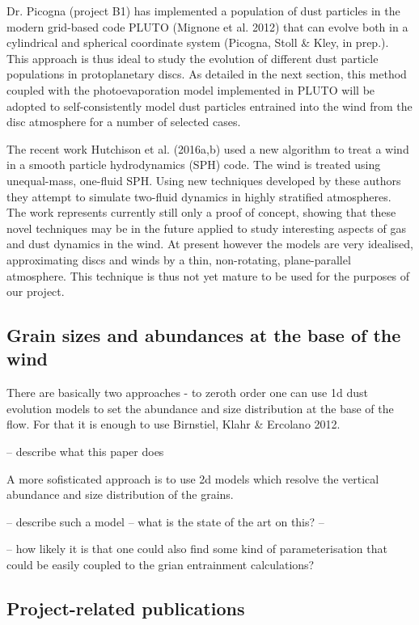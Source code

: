 \documentclass[10pt,fleqn,twoside]{article}
\newcommand{\Tcol}{\color{blue}}
\begin{document}
Dr. Picogna (project B1) has implemented a population of dust
particles in the modern grid-based code PLUTO (Mignone et al. 2012)
that can evolve both in a cylindrical and spherical coordinate system
(Picogna, Stoll \& Kley, in prep.). This approach is thus ideal to
study the evolution of different dust particle populations in
protoplanetary discs. As detailed in the next section, this method
coupled with the photoevaporation model implemented in PLUTO will be
adopted to self-consistently model dust particles entrained into the
wind from the disc atmosphere for a number of selected cases.

The recent work Hutchison et al. (2016a,b) used a new algorithm to
treat a wind in a smooth particle hydrodynamics (SPH) code. The wind is
treated using unequal-mass, one-fluid SPH. Using new techniques
developed by these authors they attempt to simulate two-fluid dynamics
in highly stratified atmospheres. The work represents currently still
only a proof of concept, showing that these novel techniques may be in
the future applied to study interesting aspects of gas and dust
dynamics in the wind. At present however the models are very
idealised, approximating discs and winds by a thin, non-rotating,
plane-parallel atmosphere.  This technique is thus not yet mature to
be used for the purposes of our project.

\subsection{Grain sizes and abundances at the base of the wind}

{\color{green}There are basically two approaches - to zeroth order one
  can use 1d dust evolution models to set the abundance and size
  distribution at the base of the flow. For that it is enough to use
  Birnstiel, Klahr \& Ercolano 2012. 

-- describe what this paper does 

A more sofisticated approach is to use 2d models which resolve the
vertical abundance and size distribution of the grains. 

-- describe such a model -- what is the state of the art on this? -- 

-- how likely it is that one could also find some kind of
parameterisation that could be easily coupled to the grian entrainment calculations?
}


\subsection{\Tcol Project-related publications}
\end{document}

